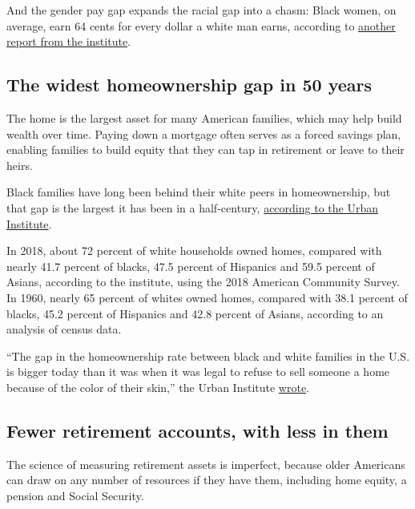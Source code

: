 And the gender pay gap expands the racial gap into a chasm: Black women,
on average, earn 64 cents for every dollar a white man earns, according
to \href{https://www.epi.org/publication/black-workers-covid/}{another
report from the institute}.

\hypertarget{the-widest-homeownership-gap-in-50-years}{%
\subsection{The widest homeownership gap in 50
years}\label{the-widest-homeownership-gap-in-50-years}}

The home is the largest asset for many American families, which may help
build wealth over time. Paying down a mortgage often serves as a forced
savings plan, enabling families to build equity that they can tap in
retirement or leave to their heirs.

Black families have long been behind their white peers in homeownership,
but that gap is the largest it has been in a half-century,
\href{https://www.urban.org/sites/default/files/publication/101160/explaining_the_black-white_homeownership_gap_a_closer_look_at_disparities_across_local_markets.pdf}{according
to the Urban Institute}.

In 2018, about 72 percent of white households owned homes, compared with
nearly 41.7 percent of blacks, 47.5 percent of Hispanics and 59.5
percent of Asians, according to the institute, using the 2018 American
Community Survey. In 1960, nearly 65 percent of whites owned homes,
compared with 38.1 percent of blacks, 45.2 percent of Hispanics and 42.8
percent of Asians, according to an analysis of census data.

``The gap in the homeownership rate between black and white families in
the U.S. is bigger today than it was when it was legal to refuse to sell
someone a home because of the color of their skin,'' the Urban Institute
\href{https://www.urban.org/policy-centers/housing-finance-policy-center/projects/reducing-racial-homeownership-gap}{wrote}.

\hypertarget{fewer-retirement-accounts-with-less-in-them}{%
\subsection{Fewer retirement accounts, with less in
them}\label{fewer-retirement-accounts-with-less-in-them}}

The science of measuring retirement assets is imperfect, because older
Americans can draw on any number of resources if they have them,
including home equity, a pension and Social Security.

